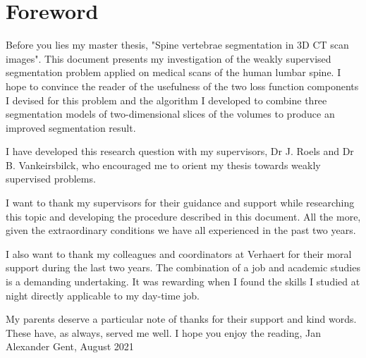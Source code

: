 \chapter*{Foreword}

\par{
Before you lies my master thesis, "Spine vertebrae segmentation in 3D CT scan images".
This document presents my investigation of the weakly supervised segmentation problem applied on medical scans of the human lumbar spine.
I hope to convince the reader of the usefulness of the two loss function components I devised for this problem and the algorithm I developed to combine three segmentation models of two-dimensional slices of the volumes to produce an improved segmentation result.
}
\par{
I have developed this research question with my supervisors, Dr J. Roels and Dr B. Vankeirsbilck, who encouraged me to orient my thesis towards weakly supervised problems.
}
\par{
I want to thank my supervisors for their guidance and support while researching this topic and developing the procedure described in this document.
All the more, given the extraordinary conditions we have all experienced in the past two years.
}
\par{
I also want to thank my colleagues and coordinators at Verhaert for their moral support during the last two years.
The combination of a job and academic studies is a demanding undertaking.
It was rewarding when I found the skills I studied at night directly applicable to my day-time job. 
}
\par{
My parents deserve a particular note of thanks for their support and kind words. These have, as always, served me well.
}\newline
\vspace{1cm}
I hope you enjoy the reading,\newline
Jan Alexander\newline
\vspace{1cm}
Gent, August 2021
\clearpage\null\newpage